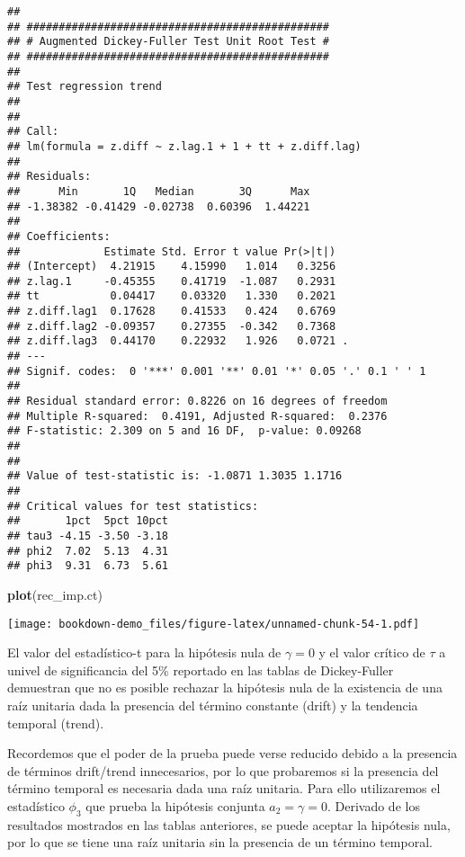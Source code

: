 \documentclass[]{book}
\newenvironment{Shaded}{\begin{snugshade}}{\end{snugshade}}
\newcommand{\KeywordTok}[1]{\textcolor[rgb]{0.13,0.29,0.53}{\textbf{#1}}}
\newcommand{\NormalTok}[1]{#1}
\theoremstyle{definition}
\theoremstyle{definition}
\theoremstyle{definition}
\theoremstyle{remark}
\begin{document}
\begin{verbatim}
## 
## ############################################### 
## # Augmented Dickey-Fuller Test Unit Root Test # 
## ############################################### 
## 
## Test regression trend 
## 
## 
## Call:
## lm(formula = z.diff ~ z.lag.1 + 1 + tt + z.diff.lag)
## 
## Residuals:
##      Min       1Q   Median       3Q      Max 
## -1.38382 -0.41429 -0.02738  0.60396  1.44221 
## 
## Coefficients:
##             Estimate Std. Error t value Pr(>|t|)  
## (Intercept)  4.21915    4.15990   1.014   0.3256  
## z.lag.1     -0.45355    0.41719  -1.087   0.2931  
## tt           0.04417    0.03320   1.330   0.2021  
## z.diff.lag1  0.17628    0.41533   0.424   0.6769  
## z.diff.lag2 -0.09357    0.27355  -0.342   0.7368  
## z.diff.lag3  0.44170    0.22932   1.926   0.0721 .
## ---
## Signif. codes:  0 '***' 0.001 '**' 0.01 '*' 0.05 '.' 0.1 ' ' 1
## 
## Residual standard error: 0.8226 on 16 degrees of freedom
## Multiple R-squared:  0.4191, Adjusted R-squared:  0.2376 
## F-statistic: 2.309 on 5 and 16 DF,  p-value: 0.09268
## 
## 
## Value of test-statistic is: -1.0871 1.3035 1.1716 
## 
## Critical values for test statistics: 
##       1pct  5pct 10pct
## tau3 -4.15 -3.50 -3.18
## phi2  7.02  5.13  4.31
## phi3  9.31  6.73  5.61
\end{verbatim}

\begin{Shaded}
\begin{Highlighting}[]
\KeywordTok{plot}\NormalTok{(rec_imp.ct)}
\end{Highlighting}
\end{Shaded}

\texttt{[image: bookdown-demo\_files/figure-latex/unnamed-chunk-54-1.pdf]}

El valor del estadístico-t para la hipótesis nula de \(\gamma=0\) y el
valor crítico de \(\tau\) a univel de significancia del 5\% reportado en
las tablas de Dickey-Fuller demuestran que no es posible rechazar la
hipótesis nula de la existencia de una raíz unitaria dada la presencia
del término constante (drift) y la tendencia temporal (trend).

Recordemos que el poder de la prueba puede verse reducido debido a la
presencia de términos drift/trend innecesarios, por lo que probaremos si
la presencia del término temporal es necesaria dada una raíz unitaria.
Para ello utilizaremos el estadístico \(\phi_3\) que prueba la hipótesis
conjunta \(a_2=\gamma=0\). Derivado de los resultados mostrados en las
tablas anteriores, se puede aceptar la hipótesis nula, por lo que se
tiene una raíz unitaria sin la presencia de un término temporal.
\end{document}
